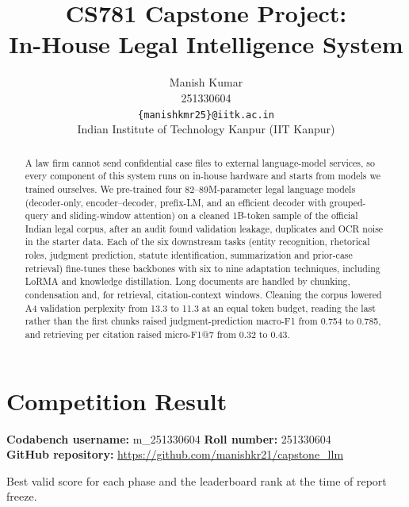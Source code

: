 \documentclass[11pt, oneside]{article}
\title{CS781 Capstone Project:\\
In-House Legal Intelligence System}
\author{
    Manish Kumar  \\
    251330604 \\
    {\tt \{manishkmr25\}@iitk.ac.in}\\
    Indian Institute of Technology Kanpur (IIT Kanpur)
}
\date{}
\begin{document}
\maketitle

\begin{abstract}
A law firm cannot send confidential case files to external language-model services, so every component of
this system runs on in-house hardware and starts from models we trained ourselves.  We pre-trained four
82--89M-parameter legal language models (decoder-only, encoder--decoder, prefix-LM, and an efficient decoder
with grouped-query and sliding-window attention) on a cleaned 1B-token sample of the official Indian legal
corpus, after an audit found validation leakage, duplicates and OCR noise in the starter data.  Each of the
six downstream tasks (entity recognition, rhetorical roles, judgment prediction, statute identification,
summarization and prior-case retrieval) fine-tunes these backbones with six to nine adaptation techniques,
including LoRMA and knowledge distillation.  Long documents are handled by chunking, condensation and, for
retrieval, citation-context windows.  Cleaning the corpus lowered A4 validation perplexity from 13.3 to 11.3
at an equal token budget, reading the last rather than the first chunks raised judgment-prediction macro-F1
from 0.754 to 0.785, and retrieving per citation raised micro-F1@7 from 0.32 to 0.43.
\end{abstract}

\section{Competition Result}
\noindent
\textbf{Codabench username:} m\_251330604
\hfill
\textbf{Roll number:} 251330604\\
\textbf{GitHub repository:} \url{https://github.com/manishkr21/capstone_llm}

\medskip
\noindent
Best valid score for each phase and the leaderboard rank at the time of report freeze.
\end{document}
